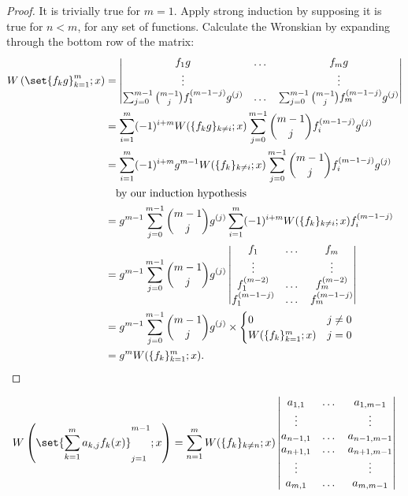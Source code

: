 \documentclass{book}
\begin{document}
\begin{proof}
It is trivially true for $m=1$.
Apply strong induction by supposing it is true for $n<m$, for any set of functions.
Calculate the Wronskian by expanding through the bottom row of the matrix:
\begin{align*}
\W{\set{f_k g}_{k=1}^m}{x}
& = \begin{vmatrix}
f_1 g & \dots & f_m g \\
\vdots & & \vdots \\
\sum_{j=0}^{m-1} \binom{m-1}{j} f_1^{(m-1-j)} g^{(j)}
& \dots & \sum_{j=0}^{m-1} \binom{m-1}{j} f_m^{(m-1-j)} g^{(j)}
\end{vmatrix} \\
& = \sum_{i=1}^m (-1)^{i+m} W(\{f_k g\}_{k \neq i} ; x) \sum_{j=0}^{m-1} \binom{m-1}{j} f_i^{(m-1-j)} g^{(j)} \\
& = \sum_{i=1}^m (-1)^{i+m} g^{m-1} W(\{ f_k \}_{k \neq i} ; x) \sum_{j=0}^{m-1} \binom{m-1}{j} f_i^{(m-1-j)} g^{(j)} \\
& \quad \text{by our induction hypothesis} \\
& = g^{m-1} \sum_{j=0}^{m-1} \binom{m-1}{j} g^{(j)}
\sum_{i=1}^m (-1)^{i+m} W(\{f_k\}_{k\neq i} ; x) f_i^{(m-1-j)} \\
& = g^{m-1} \sum_{j=0}^{m-1} \binom{m-1}{j} g^{(j)}
\begin{vmatrix} f_1 & \dots & f_m \\
\vdots & & \vdots \\
f_1^{(m-2)} & \dots & f_m^{(m-2)} \\
f_1^{(m-1-j)} & \dots & f_m^{(m-1-j)} \end{vmatrix} \\
& = g^{m-1} \sum_{j=0}^{m-1} \binom{m-1}{j} g^{(j)} \times \begin{cases} 0 & j\neq 0 \\
W(\{f_k\}_{k=1}^m ; x) & j = 0 \end{cases} \\
& = g^m W(\{f_k\}_{k=1}^m ; x) .
\end{align*}
\end{proof}

\begin{lemma}
\begin{equation*}
\W{ \set{ \sum_{k=1}^m a_{k,j} f_k(x) }_{j=1}^{m-1} }{ x} = \sum_{n=1}^m W(\{f_k\}_{k\neq n} ; x) \begin{vmatrix}
a_{1,1} & \dots & a_{1,m-1} \\
\vdots & & \vdots \\
a_{n-1,1} & \dots & a_{n-1,m-1} \\
a_{n+1,1} & \dots & a_{n+1,m-1} \\
\vdots & & \vdots \\
a_{m,1} & \dots & a_{m,m-1}
\end{vmatrix}
\end{equation*}
\label{lem:sum}
\end{lemma}
\end{document}
